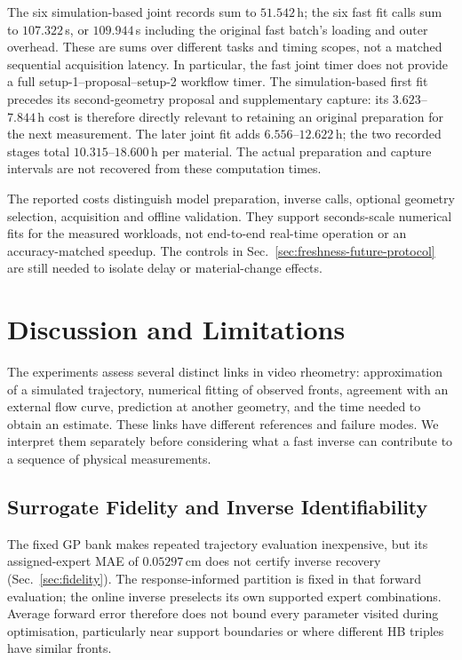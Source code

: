 The six simulation-based joint records sum to $51.542$\,h; the six
fast fit calls sum to $107.322$\,s, or $109.944$\,s including the
original fast batch's loading and outer overhead. These are sums
over different tasks and timing scopes, not a matched sequential
acquisition latency. In particular, the fast joint timer does not
provide a full setup-1--proposal--setup-2 workflow timer. The
simulation-based first fit precedes its second-geometry proposal and
supplementary capture: its $3.623$--$7.844$\,h cost is therefore
directly relevant to retaining an original preparation for the next
measurement. The later joint fit adds $6.556$--$12.622$\,h; the
two recorded stages total $10.315$--$18.600$\,h per material.
The actual preparation and capture intervals are not recovered from
these computation times.

The reported costs distinguish model preparation, inverse calls,
optional geometry selection, acquisition and offline validation.
They support seconds-scale numerical fits for the measured workloads,
not end-to-end real-time operation or an accuracy-matched speedup.
The controls in Sec.~\ref{sec:freshness-future-protocol} are still needed
to isolate delay or material-change effects.\FloatBarrier

\section{Discussion and Limitations}
\label{sec:discussion}

The experiments assess several distinct links in video rheometry:
approximation of a simulated trajectory, numerical fitting of observed
fronts, agreement with an external flow curve, prediction at another
geometry, and the time needed to obtain an estimate. These links have
different references and failure modes. We interpret them separately
before considering what a fast inverse can contribute to a sequence of
physical measurements.

\subsection{Surrogate Fidelity and Inverse Identifiability}

The fixed GP bank makes repeated trajectory evaluation inexpensive,
but its assigned-expert MAE of $0.05297$\,cm does not certify inverse
recovery (Sec.~\ref{sec:fidelity}). The response-informed partition is
fixed in that forward evaluation; the online inverse preselects its
own supported expert combinations. Average forward error therefore
does not bound every parameter visited during optimisation, particularly
near support boundaries or where different HB triples have similar fronts.

